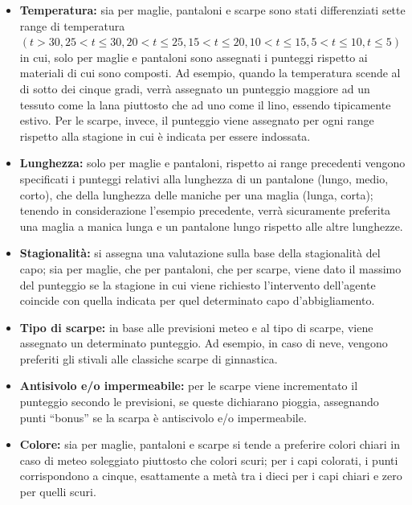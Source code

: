 \documentclass[a4paper, 11pt, oneside]{report}
\begin{document}
            \begin{itemize}
                \item \textbf{Temperatura:} sia per maglie, pantaloni e scarpe sono stati differenziati sette range di temperatura
                $(t>30, 25<t\leq 30, 20<t\leq 25, 15<t\leq 20, 10<t\leq 15, 5<t\leq 10, t\leq 5)$ in cui,
                solo per maglie e pantaloni sono assegnati i punteggi rispetto ai materiali di cui sono composti.
                Ad esempio, quando la temperatura scende al di sotto dei cinque gradi, verrà assegnato un punteggio maggiore ad un tessuto
                come la lana piuttosto che ad uno come il lino, essendo tipicamente estivo.
                Per le scarpe, invece, il punteggio viene assegnato per ogni range rispetto alla stagione in cui è indicata per essere
                indossata.
                \item \textbf{Lunghezza:} solo per maglie e pantaloni, rispetto ai range precedenti vengono specificati i punteggi relativi
                alla lunghezza di un pantalone (lungo, medio, corto), che della lunghezza delle maniche per una maglia (lunga, corta);
                tenendo in considerazione l'esempio precedente, verrà sicuramente preferita una maglia a manica lunga e un pantalone
                lungo rispetto alle altre lunghezze.
                \item \textbf{Stagionalità:} si assegna una valutazione sulla base della stagionalità del capo; sia per maglie, che per
                pantaloni, che per scarpe, viene dato il massimo del punteggio se la stagione in cui viene richiesto l'intervento dell'agente coincide
                con quella indicata per quel determinato capo d'abbigliamento.
                \item \textbf{Tipo di scarpe:} in base alle previsioni meteo e al tipo di scarpe, viene assegnato un determinato punteggio.
                Ad esempio, in caso di neve, vengono preferiti gli stivali alle classiche scarpe di ginnastica.
                \item \textbf{Antisivolo e/o impermeabile:} per le scarpe viene incrementato il
                punteggio secondo le previsioni, se queste dichiarano pioggia, assegnando punti ``bonus'' se la
                scarpa è antiscivolo e/o impermeabile.
                \item \textbf{Colore:} sia per maglie, pantaloni e scarpe si tende a preferire colori chiari in caso di meteo
                soleggiato piuttosto che colori scuri; per i capi colorati, i punti corrispondono a cinque, esattamente a
                metà tra i dieci per i capi chiari e zero per quelli scuri.
            \end{itemize}
\end{document}

